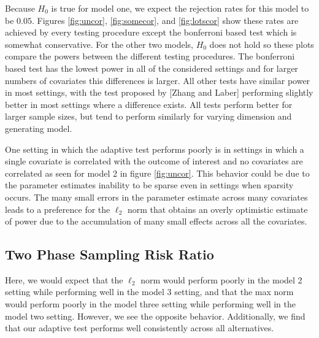 \documentclass{article}
\begin{document}
Because $H_0$ is true for model one, we expect the rejection rates for this model to be $0.05$.  Figures \ref{fig:uncor}, \ref{fig:somecor}, and \ref{fig:lotscor} show these rates are achieved by every testing procedure except the bonferroni based test which is somewhat conservative.  For the other two models, $H_0$ does not hold so these plots compare the powers between the different testing procedures.  The bonferroni based test has the lowest power in all of the considered settings and for larger numbers of covariates this differences is larger. All other tests have similar power in most settings, with the test proposed by [Zhang and Laber] performing slightly better in most settings where a difference exists.  All tests perform better for larger sample sizes, but tend to perform similarly for varying dimension and generating model.

One setting in which the adaptive test performs poorly is in settings in which a single covariate is correlated with the outcome of interest and no covariates are correlated as seen for model 2 in figure \ref{fig:uncor}. This behavior could be due to the parameter estimates inability to be sparse even in settings when sparsity occurs.  The many small errors in the parameter estimate across many covariates leads to a preference for the $\ell_2$ norm that obtains an overly optimistic estimate of power due to the accumulation of many small effects across all the covariates.


\subsection*{Two Phase Sampling Risk Ratio}
Here, we would expect that the $\ell_2$ norm would perform poorly in the model 2 setting while performing well in the model 3 setting, and that the max norm would perform poorly in the model three setting while performing well in the model two setting.  However, we see the opposite behavior.  Additionally, we find that our adaptive test performs well consistently across all alternatives. 
\end{document}

